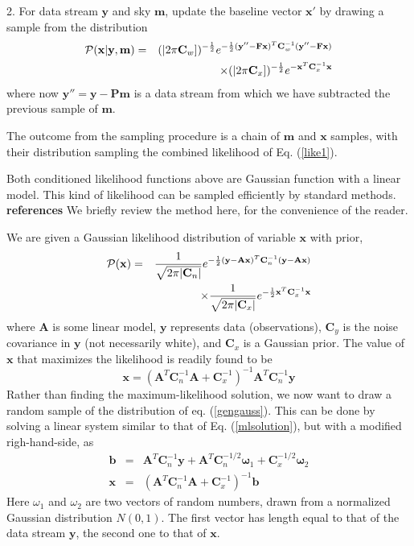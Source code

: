 \documentclass[traditabstract]{aa}
\newcommand{\ve}[1]{{\mathbf #1}}
\newcommand{\ma}[1]{\mathbf{#1}}
\newcommand{\pcal}{{\cal P}}
\begin{document}
2. For data stream $\ve y$ and sky $\ve m$,
    update the baseline vector $\ve x'$
    by drawing a sample
from the distribution
%
\begin{eqnarray}
\pcal(\ve x \vert \ve y,\ve m) &=& (|2\pi\ma{C}_w])^{-\frac12} 
e^{-\frac12(\ve y'' -\ma{F}\ve{x} )^T\ma{C}_w^{-1}
                 (\ve y'' -\ma{F}\ve{x} ) } \\
&& \times                 (|2\pi\ma{C}_x])^{-\frac12}  e^{-\ve{x}^T\ma{C}_x^{-1}\ve x} \nonumber
\end{eqnarray}
%
where now $\ve y''=\ve y-\ma P\ve m$
is a data stream from which we have subtracted 
the previous sample of $\ve m$.

The outcome from the sampling procedure is a chain
of $\ve m$ and $\ve x$ samples,
with their distribution sampling the combined likelihood
of Eq. (\ref{like1}).

Both conditioned likelihood functions above
are Gaussian function with a linear model.
This kind of likelihood can be sampled efficiently
by standard methods. {\bf references}
We briefly review the method here, for the convenience of the reader.

We are given a Gaussian likelihood distribution of variable $\ve x$ with prior,
%
\begin{eqnarray}
\pcal(\ve x) &=& \frac{1}{\sqrt{2\pi|\ma C_n|}} e^{-\frac12 (\ve y-\ma A\ve x)^T\ma C_n^{-1} (\ve y-\ma A\ve x)}  \label{gengauss}\\
&& \times \frac{1}{\sqrt{2\pi|\ma C_x|}} e^{-\frac12 \ve x^T\ma C_x^{-1} \ve x}  \nonumber
\end{eqnarray}
%
where $\ma A$ is some linear model, $\ve y$ represents data (observations), 
$\ma C_y$ is the noise covariance in $\ve y$ (not necessarily white),
and $\ma C_x$ is a Gaussian prior.
%
The value of $\ve x$ that maximizes the likelihood is readily found to be
%
\begin{equation}
\ve x = (\ma A^T \ma C_n^{-1}\ma A +\ma C_x^{-1})^{-1} \ma A^T \ma C_n^{-1} \ve y  \label{mlsolution}
\end{equation}
%
Rather than finding the maximum-likelihood solution,
we now want to draw a random sample of the distribution of eq. (\ref{gengauss}).
This can be done by solving a linear system similar to that of Eq. (\ref{mlsolution}),
but with a modified righ-hand-side, as
%
\begin{eqnarray}
\ve b &=&  \ma A^T \ma C_n^{-1} \ve y  
        +\ma A^T\ma C_n^{-1/2}\ve\omega_1 
        +\ma C_x^{-1/2}\ve\omega_2  \nonumber \\
\ve x &=& (\ma A^T \ma C_n^{-1}\ma A +\ma C_x^{-1})^{-1} \ve b \label{gibbssolution}
\end{eqnarray}
%
Here $\omega_1$ and $\omega_2$
are two vectors of random numbers, drawn from a normalized 
Gaussian distribution $N(0,1)$.
The first vector has length equal to that of the data stream $\ve y$,
the second one to that of $\ve x$.
\end{document}
